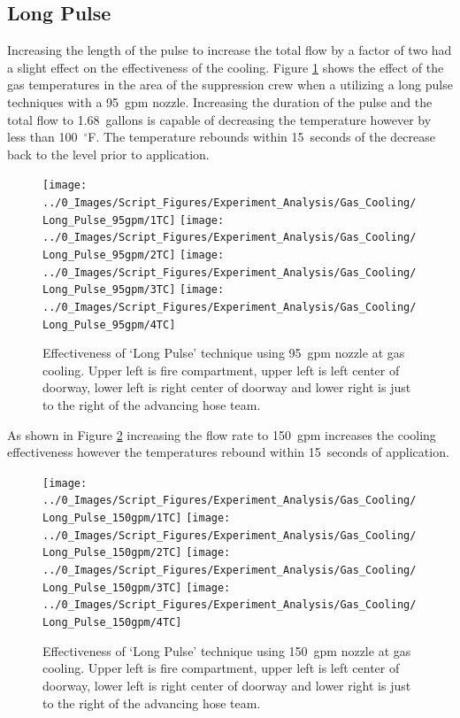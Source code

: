 \documentclass[12pt,oneside]{book}
\begin{document}
\subsection{Long Pulse}
Increasing the length of the pulse to increase the total flow by a factor of two had a slight effect on the effectiveness of the cooling. Figure \ref{fig:gas_long_pulse_95} shows the effect of the gas temperatures in the area of the suppression crew when a utilizing a long pulse techniques with a 95~gpm nozzle. Increasing the duration of the pulse and the total flow to 1.68~gallons is capable of decreasing the temperature however by less than 100~$^\circ$F. The temperature rebounds within 15~seconds of the decrease back to the level prior to application. 

\begin{figure}[H]
\centering
\texttt{[image: ../0\_Images/Script\_Figures/Experiment\_Analysis/Gas\_Cooling/Long\_Pulse\_95gpm/1TC]}
\texttt{[image: ../0\_Images/Script\_Figures/Experiment\_Analysis/Gas\_Cooling/Long\_Pulse\_95gpm/2TC]}
\texttt{[image: ../0\_Images/Script\_Figures/Experiment\_Analysis/Gas\_Cooling/Long\_Pulse\_95gpm/3TC]}
\texttt{[image: ../0\_Images/Script\_Figures/Experiment\_Analysis/Gas\_Cooling/Long\_Pulse\_95gpm/4TC]}
\caption[Gas Cooling - Long Pulse 95~gpm]{Effectiveness of `Long Pulse' technique using 95~gpm nozzle at gas cooling. Upper left is fire compartment, upper left is left center of doorway, lower left is right center of doorway and lower right is just to the right of the advancing hose team.}
\label{fig:gas_long_pulse_95}
\end{figure}

As shown in Figure \ref{fig:gas_long_pulse_150} increasing the flow rate to 150~gpm increases the cooling effectiveness however the temperatures rebound within 15~seconds of application. 

\begin{figure}[H]
\centering
\texttt{[image: ../0\_Images/Script\_Figures/Experiment\_Analysis/Gas\_Cooling/Long\_Pulse\_150gpm/1TC]}
\texttt{[image: ../0\_Images/Script\_Figures/Experiment\_Analysis/Gas\_Cooling/Long\_Pulse\_150gpm/2TC]}
\texttt{[image: ../0\_Images/Script\_Figures/Experiment\_Analysis/Gas\_Cooling/Long\_Pulse\_150gpm/3TC]}
\texttt{[image: ../0\_Images/Script\_Figures/Experiment\_Analysis/Gas\_Cooling/Long\_Pulse\_150gpm/4TC]}
\caption[Gas Cooling - Long Pulse 150~gpm]{Effectiveness of `Long Pulse' technique using 150~gpm nozzle at gas cooling. Upper left is fire compartment, upper left is left center of doorway, lower left is right center of doorway and lower right is just to the right of the advancing hose team.}
\label{fig:gas_long_pulse_150}
\end{figure}
\end{document}
